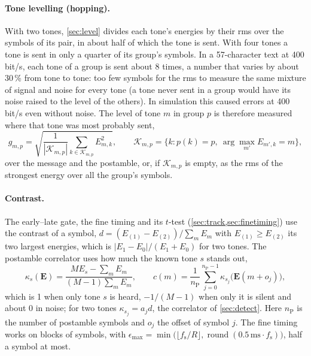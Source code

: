 \documentclass[11pt,a4paper]{article}
\newcommand{\ms}{\,\mathrm{ms}}
\newcommand{\round}[1]{\operatorname{round}\!\left(#1\right)}
\newcommand{\fs}{f_{\mathrm{s}}}
\theoremstyle{remark}
\begin{document}
\paragraph{Tone levelling (hopping).}
With two tones, \cref{sec:level} divides each tone's energies by their rms over the symbols of its pair, in about half of which the tone is sent. With four tones a tone is sent in only a quarter of its group's symbols. In a 57-character text at 400 bit/s, each tone of a group is sent about 8 times, a number that varies by about 30\,\% from tone to tone: too few symbols for the rms to measure the same mixture of signal and noise for every tone (a tone never sent in a group would have its noise raised to the level of the others). In simulation this caused errors at 400 bit/s even without noise. The level of tone $m$ in group $p$ is therefore measured where that tone was most probably sent,
\begin{equation}
g_{m,p} = \sqrt{\frac{1}{|\mathcal K_{m,p}|} \sum_{k \in \mathcal K_{m,p}} E_{m,k}^2}, \qquad \mathcal K_{m,p} = \bigl\{k : p(k) = p,\ \arg\max_{m'} E_{m',k} = m\bigr\},
\end{equation}
over the message and the postamble, or, if $\mathcal K_{m,p}$ is empty, as the rms of the strongest energy over all the group's symbols.

\paragraph{Contrast.}
The early--late gate, the fine timing and its $t$-test (\cref{sec:track,sec:finetiming}) use the contrast of a symbol, $d = (E_{(1)} - E_{(2)})/\sum_m E_m$ with $E_{(1)} \ge E_{(2)}$ its two largest energies, which is $|E_1 - E_0|/(E_1 + E_0)$ for two tones. The postamble correlator uses how much the known tone $s$ stands out,
\begin{equation}
\kappa_s(\bm E) = \frac{M E_s - \sum_m E_m}{(M - 1) \sum_m E_m}, \qquad c(m) = \frac{1}{n_{\mathrm P}} \sum_{j=0}^{n_{\mathrm P} - 1} \kappa_{s_j}\bigl(\bm E(m + o_j)\bigr),
\end{equation}
which is 1 when only tone $s$ is heard, $-1/(M-1)$ when only it is silent and about 0 in noise; for two tones $\kappa_{s_j} = a_j d$, the correlator of \cref{sec:detect}. Here $n_{\mathrm P}$ is the number of postamble symbols and $o_j$ the offset of symbol $j$. The fine timing works on blocks of symbols, with $\epsilon_{\max} = \min\bigl(\lfloor \fs/R \rfloor, \round{0.5\ms \cdot \fs}\bigr)$, half a symbol at most.
\end{document}
